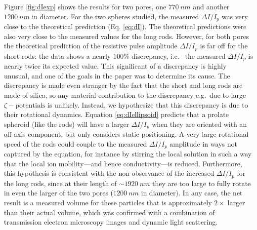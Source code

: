 			
			Figure \ref{fig:dIexp} shows the results for two pores, one $\SI{770}{nm}$ and another $\SI{1200}{nm}$ in diameter. For the two spheres studied, the measured $\Delta I/I_{p}$ was very close to the theoretical prediction (Eq. \ref{eq:dI}). The theoretical predictions were also very close to the measured values for the long rods. However, for both pores the theoretical prediction of the resistive pulse amplitude $\Delta I/I_{p}$ is far off for the short rods: the data shows a nearly 100\% discrepancy, i.e.~ the measured $\Delta I/I_{p}$ is nearly twice its expected value. This significant of a discrepancy is highly unusual, and one of the goals in the paper was to determine its cause. The discrepancy is made even stranger by the fact that the short and long rods are made of silica, so any material contribution to the discrepancy e.g.~due to large $\zeta-\mathrm{potentials}$ is unlikely. Instead, we hypothesize that this discrepancy is due to their rotational dynamics. Equation \ref{eq:dIellipsoid} predicts that a prolate spheroid (like the rods) will have a larger $\Delta I/I_{p}$ when they are oriented with an off-axis component, but only considers static positioning. A very large rotational speed of the rods could couple to the measured $\Delta I/I_{p}$ amplitude in ways not captured by the equation, for instance by stirring the local solution in such a way that the local ion mobility---and hence conductivity---is reduced. Furthermore, this hypothesis is consistent with the non-observance of the increased $\Delta I/I_{p}$ for the long rods, since at their length of $\sim\SI{1920}{nm}$ they are too large to fully rotate in even the larger of the two pores ($\SI{1200}{nm}$ in diameter). In any case, the net result is a measured volume for these particles that is approximately $2\times$ larger than their actual volume, which was confirmed with a combination of transmission electron microscopy images and dynamic light scattering. 
			
